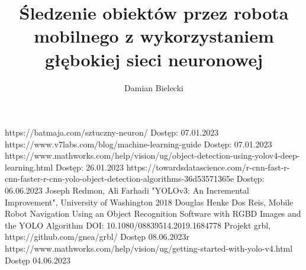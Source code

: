 \documentclass[12pt,twoside]{article}
\author{Damian Bielecki}
\title{Śledzenie obiektów przez robota mobilnego z wykorzystaniem głębokiej sieci neuronowej}
\begin{document}
\maketitle

\blankpage

\tableofcontents

\clearpage
\blankpage


















\clearpage
{}
\begin{thebibliography}{4}
	 https://batmaja.com/sztuczny-neuron/ Dostęp: 07.01.2023 
	 https://www.v7labs.com/blog/machine-learning-guide Dostęp: 07.01.2023 
	 https://www.mathworks.com/help/vision/ug/object-detection-using-yolov4-deep-learning.html Dostęp: 26.01.2023 
	 https://towardsdatascience.com/r-cnn-fast-r-cnn-faster-r-cnn-yolo-object-detection-algorithms-36d53571365e Dostęp: 06.06.2023 
	 Joseph Redmon, Ali Farhadi "YOLOv3: An Incremental Improvement", University of Washington 2018 
	Douglas Henke Dos Reis,  Mobile Robot Navigation Using an Object Recognition Software with RGBD Images and the YOLO Algorithm DOI: 10.1080/08839514.2019.1684778
	 Projekt grbl, https://github.com/gnea/grbl/ Dostęp 08.06.2023r 
	 https://www.mathworks.com/help/vision/ug/getting-started-with-yolo-v4.html Dostęp 04.06.2023 
\end{thebibliography}

\clearpage
\end{document}
